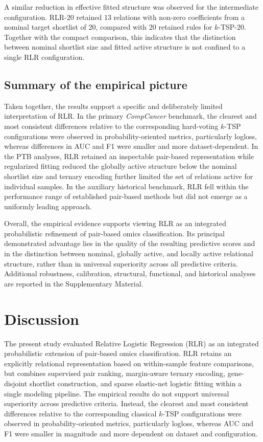 \documentclass[journal]{IEEEtran}
\begin{document}
A similar reduction in effective fitted structure was observed for the intermediate configuration. RLR-20 retained 13 relations with non-zero coefficients from a nominal target shortlist of 20, compared with 20 retained rules for $k$-TSP-20. Together with the compact comparison, this indicates that the distinction between nominal shortlist size and fitted active structure is not confined to a single RLR configuration.

\subsection{Summary of the empirical picture}

Taken together, the results support a specific and deliberately limited interpretation of RLR. In the primary \emph{CompCancer} benchmark, the clearest and most consistent differences relative to the corresponding hard-voting $k$-TSP configurations were observed in probability-oriented metrics, particularly logloss, whereas differences in AUC and F1 were smaller and more dataset-dependent. In the PTB analyses, RLR retained an inspectable pair-based representation while regularized fitting reduced the globally active structure below the nominal shortlist size and ternary encoding further limited the set of relations active for individual samples. In the auxiliary historical benchmark, RLR fell within the performance range of established pair-based methods but did not emerge as a uniformly leading approach.

Overall, the empirical evidence supports viewing RLR as an integrated probabilistic refinement of pair-based omics classification. Its principal demonstrated advantage lies in the quality of the resulting predictive scores and in the distinction between nominal, globally active, and locally active relational structure, rather than in universal superiority across all predictive criteria. Additional robustness, calibration, structural, functional, and historical analyses are reported in the Supplementary Material.



\section{Discussion}\label{sec:discussion}

The present study evaluated Relative Logistic Regression (RLR) as an integrated probabilistic extension of pair-based omics classification. RLR retains an explicitly relational representation based on within-sample feature comparisons, but combines supervised pair ranking, margin-aware ternary encoding, gene-disjoint shortlist construction, and sparse elastic-net logistic fitting within a single modeling pipeline. The empirical results do not support universal superiority across predictive criteria. Instead, the clearest and most consistent differences relative to the corresponding classical $k$-TSP configurations were observed in probability-oriented metrics, particularly logloss, whereas AUC and F1 were smaller in magnitude and more dependent on dataset and configuration.
\end{document}
